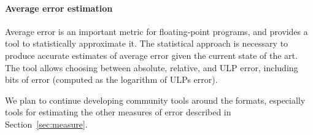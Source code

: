 \documentclass[main.tex]{subfiles}
\begin{document}
\paragraph{Average error estimation}
Average error is an important metric for floating-point programs,
  and \name provides a tool to statistically approximate it.
The statistical approach is necessary to produce accurate estimates
  of average error given the current state of the art.
The tool allows choosing between absolute, relative, and ULP error,
  including bits of error (computed as the logarithm of ULPs error).

We plan to continue developing community tools around the \name formats,
  especially tools for estimating the other measures of error
  described in Section~\ref{sec:measure}.
\end{document}
